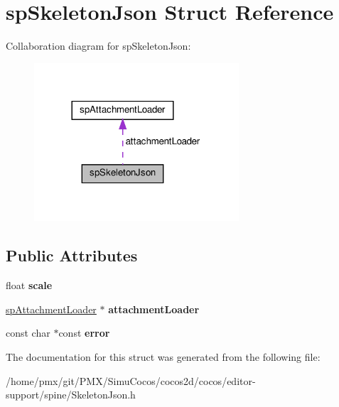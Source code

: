 \hypertarget{structspSkeletonJson}{}\section{sp\+Skeleton\+Json Struct Reference}
\label{structspSkeletonJson}


Collaboration diagram for sp\+Skeleton\+Json\+:
\nopagebreak
\begin{figure}[H]
\begin{center}
\leavevmode
\includegraphics[width=216pt]{structspSkeletonJson__coll__graph}
\end{center}
\end{figure}
\subsection*{Public Attributes}
\begin{DoxyCompactItemize}
\item 
\mbox{\label{structspSkeletonJson_ad649e74bc1a08540087dcd56616f55fe}} 
float {\bfseries scale}
\item 
\mbox{\label{structspSkeletonJson_a1b698cc991e9a662d36645bfbe592728}} 
\hyperlink{structspAttachmentLoader}{sp\+Attachment\+Loader} $\ast$ {\bfseries attachment\+Loader}
\item 
\mbox{\label{structspSkeletonJson_a43043f18c3edb4608bb4c685f77ce7ad}} 
const char $\ast$const {\bfseries error}
\end{DoxyCompactItemize}


The documentation for this struct was generated from the following file\+:\begin{DoxyCompactItemize}
\item 
/home/pmx/git/\+P\+M\+X/\+Simu\+Cocos/cocos2d/cocos/editor-\/support/spine/Skeleton\+Json.\+h\end{DoxyCompactItemize}
